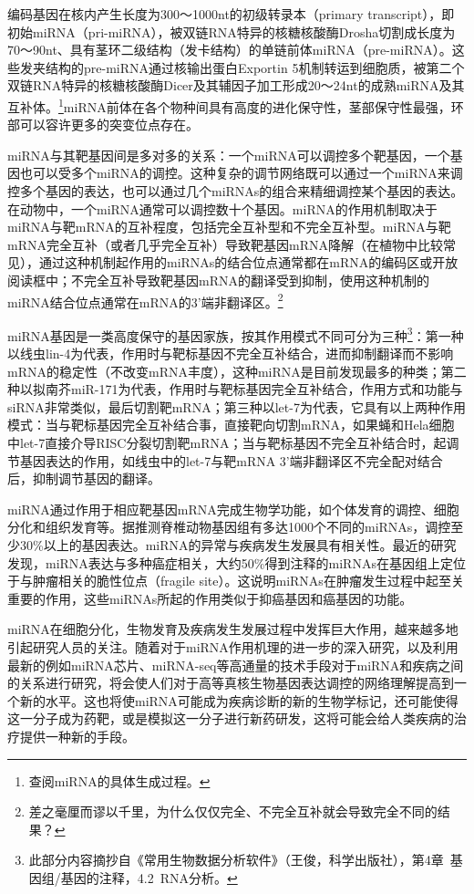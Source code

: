 \documentclass[11pt,a4paper,twoside]{book}
\begin{document}
编码基因在核内产生长度为300～1000nt的初级转录本（primary transcript），即初始miRNA（pri-miRNA），被双链RNA特异的核糖核酸酶Drosha切割成长度为70～90nt、具有茎环二级结构（发卡结构）的单链前体miRNA（pre-miRNA）。这些发夹结构的pre-miRNA通过核输出蛋白Exportin 5机制转运到细胞质，被第二个双链RNA特异的核糖核酸酶Dicer及其辅因子加工形成20～24nt的成熟miRNA及其互补体。\footnote{查阅miRNA的具体生成过程。}miRNA前体在各个物种间具有高度的进化保守性，茎部保守性最强，环部可以容许更多的突变位点存在。

miRNA与其靶基因间是多对多的关系：一个miRNA可以调控多个靶基因，一个基因也可以受多个miRNA的调控。这种复杂的调节网络既可以通过一个miRNA来调控多个基因的表达，也可以通过几个miRNAs的组合来精细调控某个基因的表达。在动物中，一个miRNA通常可以调控数十个基因。miRNA的作用机制取决于miRNA与靶mRNA的互补程度，包括完全互补型和不完全互补型。miRNA与靶mRNA完全互补（或者几乎完全互补）导致靶基因mRNA降解（在植物中比较常见），通过这种机制起作用的miRNAs的结合位点通常都在mRNA的编码区或开放阅读框中；不完全互补导致靶基因mRNA的翻译受到抑制，使用这种机制的miRNA结合位点通常在mRNA的3'端非翻译区。\footnote{差之毫厘而谬以千里，为什么仅仅完全、不完全互补就会导致完全不同的结果？}

miRNA基因是一类高度保守的基因家族，按其作用模式不同可分为三种\footnote{此部分内容摘抄自《常用生物数据分析软件》（王俊，科学出版社），第4章\ 基因组/基因的注释，4.2\ RNA分析。}：第一种以线虫lin-4为代表，作用时与靶标基因不完全互补结合，进而抑制翻译而不影响mRNA的稳定性（不改变mRNA丰度），这种miRNA是目前发现最多的种类；第二种以拟南芥miR-171为代表，作用时与靶标基因完全互补结合，作用方式和功能与siRNA非常类似，最后切割靶mRNA；第三种以let-7为代表，它具有以上两种作用模式：当与靶标基因完全互补结合事，直接靶向切割mRNA，如果蝇和Hela细胞中let-7直接介导RISC分裂切割靶mRNA；当与靶标基因不完全互补结合时，起调节基因表达的作用，如线虫中的let-7与靶mRNA 3'端非翻译区不完全配对结合后，抑制调节基因的翻译。

miRNA通过作用于相应靶基因mRNA完成生物学功能，如个体发育的调控、细胞分化和组织发育等。据推测脊椎动物基因组有多达1000个不同的miRNAs，调控至少30\%以上的基因表达。miRNA的异常与疾病发生发展具有相关性。最近的研究发现，miRNA表达与多种癌症相关，大约50\%得到注释的miRNAs在基因组上定位于与肿瘤相关的脆性位点（fragile site）。这说明miRNAs在肿瘤发生过程中起至关重要的作用，这些miRNAs所起的作用类似于抑癌基因和癌基因的功能。

miRNA在细胞分化，生物发育及疾病发生发展过程中发挥巨大作用，越来越多地引起研究人员的关注。随着对于miRNA作用机理的进一步的深入研究，以及利用最新的例如miRNA芯片、miRNA-seq等高通量的技术手段对于miRNA和疾病之间的关系进行研究，将会使人们对于高等真核生物基因表达调控的网络理解提高到一个新的水平。这也将使miRNA可能成为疾病诊断的新的生物学标记，还可能使得这一分子成为药靶，或是模拟这一分子进行新药研发，这将可能会给人类疾病的治疗提供一种新的手段。
\end{document}
